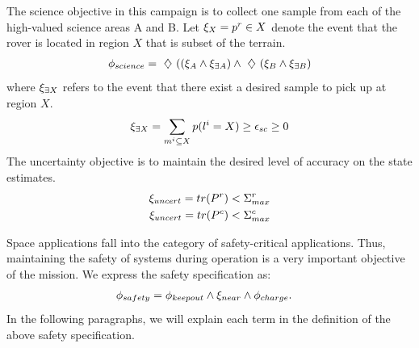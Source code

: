 \documentclass[letterpaper]{article} %
\begin{document}
\noindent{} The science objective in this campaign is to collect one sample from each of the high-valued science areas A and B. Let $\xi_{X} = p^r \in X$ denote the event that the rover is located in region $X$ that is subset of the terrain.
    \begin{align}
        \phi_{science} = \ \diamondsuit\  ((\xi_A \land \xi_{\exists A}) \land
        \ \diamondsuit\  (\xi_B \land \xi_{\exists B})
    \end{align}
    where $\xi_{\exists X}$ refers to the event that there exist a desired sample to pick up at region $X$.
    \begin{align}
    \xi_{\exists X} = \sum_{m^i \subseteq X} p(l^i=X) \geq \epsilon_{sc}\geq 0
    \end{align}
     The uncertainty objective is to maintain the desired level of accuracy on the state estimates. 
    \begin{align}
        \nonumber\xi_{uncert} = tr(P^r) < \Sigma^r_{max}\\
        \xi_{uncert} = tr(P^c) < \Sigma^c_{max}
    \end{align}
    
   \noindent {} Space applications fall into the category of safety-critical applications. Thus, maintaining the safety of systems during operation is a very important objective of the mission. We express the safety specification as:
	\begin{align}
	   \phi_{safety} &= \phi_{keepout} \land \xi_{near} \land \phi_{charge}.
	\end{align}
	In the following paragraphs, we will explain each term in the definition of the above safety specification.
	
\end{document}
